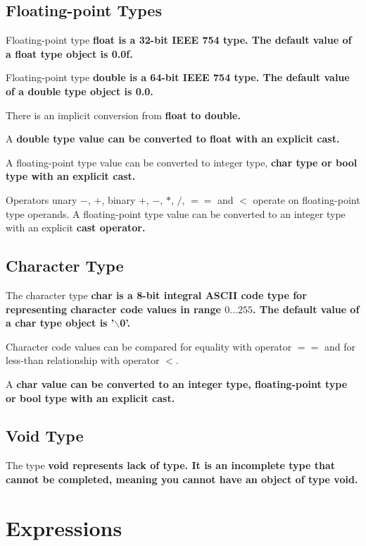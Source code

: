 \documentclass[a4paper,oneside,11pt]{article}
\begin{document}
\subsection{Floating-point Types}

Floating-point type \bf{float} is a 32-bit IEEE 754 type.
The default value of a \bf{float} type object is 0.0f.

Floating-point type \bf{double} is a 64-bit IEEE 754 type.
The default value of a \bf{double} type object is 0.0.

There is an implicit conversion from \bf{float} to \bf{double}.

A \bf{double} type value can be converted to \bf{float} with an explicit \bf{cast}.

A floating-point type value can be converted to integer type, \bf{char} type or \bf{bool} type with an explicit \bf{cast}.

Operators unary $-$, $+$, binary $+$, $-$, $*$, $/$, $==$ and $<$ operate on floating-point type operands.
A floating-point type value can be converted to an integer type with an explicit \bf{cast} operator.

\subsection{Character Type}

The character type \bf{char} is a 8-bit integral ASCII code type for representing character code values in range $0 \ldots 255$.
The default value of a \bf{char} type object is '$\backslash$0'.

Character code values can be compared for equality with operator $==$ and for less-than relationship with operator $<$.

A \bf{char} value can be converted to an integer type, floating-point type or \bf{bool} type with an explicit \bf{cast}.

\subsection{Void Type}

The type \bf{void} represents lack of type. It is an incomplete type that cannot be completed, meaning you cannot have an object of type \bf{void}.

\section{Expressions}
\end{document}
